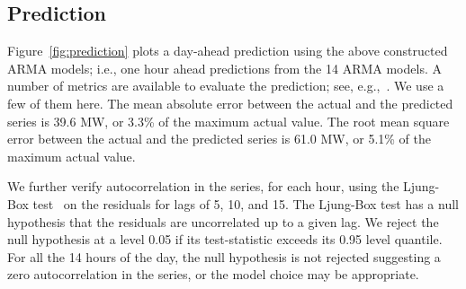 \documentclass[letter]{IEEEtran}
\begin{document}
\begin{table}[!htb]
	\centering
	\caption{Estimated $p$ and $q$ values for ARMA($p,q$) models for 14 hours of 
		the day}
	\label{tab:order}
\end{table}

\subsection{Prediction}

Figure~\ref{fig:prediction} plots a day-ahead prediction using the above 
constructed ARMA models; i.e., one hour ahead predictions from the 14 ARMA 
models. A number of metrics are available to evaluate the prediction; see, 
e.g.,~\cite{coimbra2013overview}. We use a few of them here. The mean absolute 
error between the actual 
and the predicted series is 
39.6 MW, or  3.3\% of the maximum actual value. The root mean square 
error between the actual and the predicted series is 
61.0 MW, or  5.1\% of the maximum actual value. 

We further verify autocorrelation in the series, for each hour, using the 
Ljung-Box test~\cite{ljung1978measure} on the residuals for lags of 5, 10, 
and 15. The Ljung-Box  test has a 
null hypothesis that the residuals are uncorrelated up to a 
given lag. We reject the null hypothesis at a level 0.05 if its test-statistic 
exceeds its 0.95 level quantile. For all the 14 hours of the day, the null hypothesis is not
rejected suggesting a zero autocorrelation in the series, or the 
model choice may be appropriate. 
\end{document}
